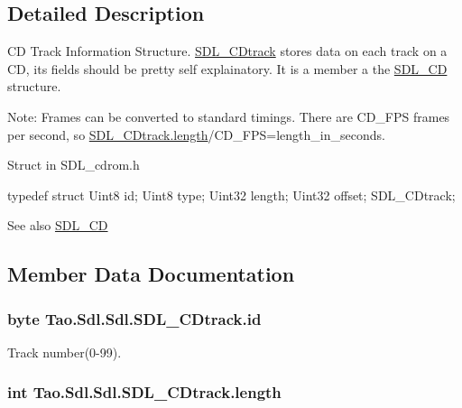\subsection{Detailed Description}
CD Track Information Structure. \hyperlink{struct_tao_1_1_sdl_1_1_sdl_1_1_s_d_l___c_dtrack}{SDL\_\-CDtrack} stores data on each track on a CD, its fields should be pretty self explainatory. It is a member a the \hyperlink{class_tao_1_1_sdl_1_1_sdl_1_1_s_d_l___c_d}{SDL\_\-CD} structure. 

Note: Frames can be converted to standard timings. There are CD\_\-FPS frames per second, so \hyperlink{struct_tao_1_1_sdl_1_1_sdl_1_1_s_d_l___c_dtrack_a827b339b0fbd1afa16e999bb4f8b88ef}{SDL\_\-CDtrack.length}/CD\_\-FPS=length\_\-in\_\-seconds. 

Struct in SDL\_\-cdrom.h 
\begin{DoxyCode}
            typedef struct{
            Uint8 id;
            Uint8 type;
            Uint32 length;
            Uint32 offset;
            } SDL_CDtrack;
\end{DoxyCode}


\begin{DoxySeeAlso}{See also}
\hyperlink{class_tao_1_1_sdl_1_1_sdl_1_1_s_d_l___c_d}{SDL\_\-CD}


\end{DoxySeeAlso}


\subsection{Member Data Documentation}
\hypertarget{struct_tao_1_1_sdl_1_1_sdl_1_1_s_d_l___c_dtrack_a0aee57191de5fac82251bd827fcf64bf}{
\subsubsection[{id}]{\setlength{\rightskip}{0pt plus 5cm}byte {\bf Tao.Sdl.Sdl.SDL\_\-CDtrack.id}}}
\label{struct_tao_1_1_sdl_1_1_sdl_1_1_s_d_l___c_dtrack_a0aee57191de5fac82251bd827fcf64bf}


Track number(0-\/99). 

\hypertarget{struct_tao_1_1_sdl_1_1_sdl_1_1_s_d_l___c_dtrack_a827b339b0fbd1afa16e999bb4f8b88ef}{
\subsubsection[{length}]{\setlength{\rightskip}{0pt plus 5cm}int {\bf Tao.Sdl.Sdl.SDL\_\-CDtrack.length}}}
\label{struct_tao_1_1_sdl_1_1_sdl_1_1_s_d_l___c_dtrack_a827b339b0fbd1afa16e999bb4f8b88ef}


